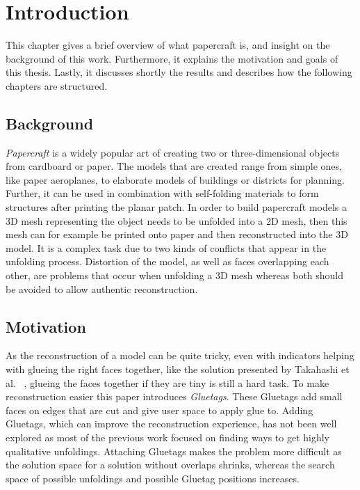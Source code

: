 \documentclass[draft,final]{vutinfth} %
\begin{document}

\tableofcontents %

\mainmatter

\chapter{Introduction}
This chapter gives a brief overview of what papercraft is, and insight on the background of this work. Furthermore, it explains the motivation and goals of this thesis. Lastly, it discusses shortly the results and describes how the following chapters are structured.

\section{Background}
\textit{Papercraft} is a widely popular art of creating two or three-dimensional objects from cardboard or paper. The models that are created range from simple ones, like paper aeroplanes, to elaborate models of buildings or districts for planning. Further, it can be used in combination with self-folding materials to form structures after printing the planar patch. In order to build papercraft models a 3D mesh representing the object needs to be unfolded into a 2D mesh, then this mesh can for example be printed onto paper and then reconstructed into the 3D model. It is a complex task due to two kinds of conflicts that appear in the unfolding process. Distortion of the model, as well as faces overlapping each other, are problems that occur when unfolding a 3D mesh whereas both should be avoided to allow authentic reconstruction.

\section{Motivation}
As the reconstruction of a model can be quite tricky, even with indicators helping with glueing the right faces together, like the solution presented by Takahashi et al.
~\cite{takahashi2011optimized}, glueing the faces together if they are tiny is still a hard task.
To make reconstruction easier this paper introduces \textit{Gluetags}. These Gluetags add small faces on edges that are cut and give user space to apply glue to. Adding Gluetags, which can improve the reconstruction experience, has not been well explored as most of the previous work focused on finding ways to get highly qualitative unfoldings. Attaching Gluetags makes the problem more difficult as the solution space for a solution without overlaps shrinks, whereas the search space of possible unfoldings and possible Gluetag positions increases.
\end{document}
